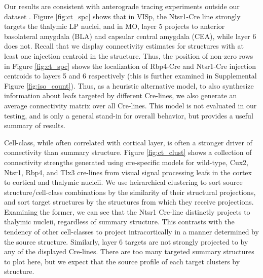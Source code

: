 Our results are consistent with anterograde tracing experiments outside our dataset \citet{Jeong2016-dc}.
Figure \ref{fig:ct_spc} shows that in VISp, the Ntsr1-Cre line strongly targets the thalymic LP nuclei, and in MO, layer 5 projects to anterior basolateral amygdala (BLA) and capsular central amygdala (CEA), while layer 6 does not.
Recall that we display connectivity estimates for structures with at least one injection centroid in the structure.
Thus, the position of non-zero rows in Figure \ref{fig:ct_spc} shows the localization of Rbp4-Cre and Ntsr1-Cre injection centroids to layers 5 and 6 respectively (this is further examined in Supplemental Figure \ref{fig:iso_count}).
Thus, as a heuristic alternative model, to also synthesize information about leafs targeted by different Cre-lines, we also generate an average connectivity matrix over all Cre-lines.
This model is not evaluated in our testing, and is only a general stand-in for overall behavior, but provides a useful summary of results.

Cell-class, while often correlated with cortical layer, is often a stronger driver of connectivity than summary structure.
Figure \ref{fig:ct_clust} shows a collection of connectivity strengths generated using cre-specific models for wild-type, Cux2, Ntsr1, Rbp4, and Tlx3 cre-lines from visual signal processing leafs in the cortex to cortical and thalymic nucleii.
We use heirarchical clustering to sort source structure/cell-class combinations by the similarity of their structural projections, and sort target structures by the structures from which they receive projections.
Examining the former, we can see that the Ntsr1 Cre-line distinctly projects to thalymic nucleii, regardless of summary structure.
This contrasts with the tendency of other cell-classes to project intracortically in a manner determined by the source structure.
Similarly, layer 6 targets are not strongly projected to by any of the displayed Cre-lines.
There are too many targeted summary structures to plot here, but we expect that the source profile of each target clusters by structure.

\newpage

